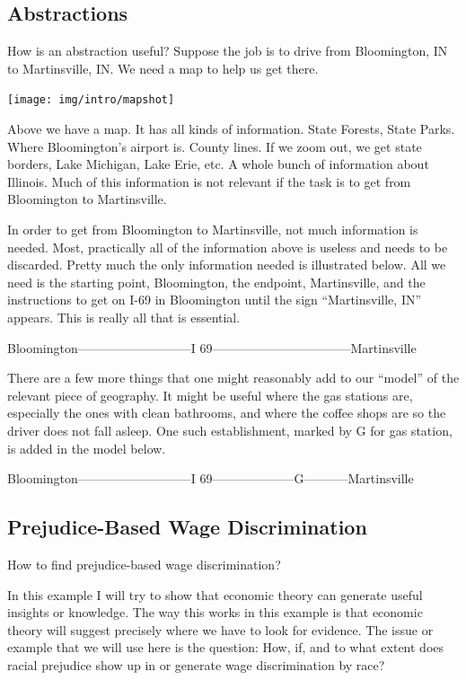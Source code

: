 \documentclass[
]{book}
\begin{document}
\hypertarget{abstractions}{%
\subsection{Abstractions}\label{abstractions}}

How is an abstraction useful? Suppose the job is to drive from Bloomington, IN to Martinsville, IN. We need a map to help us get there.

\texttt{[image: img/intro/mapshot]}

Above we have a map. It has all kinds of information. State Forests, State Parks. Where Bloomington's airport is. County lines. If we zoom out, we get state borders, Lake Michigan, Lake Erie, etc. A whole bunch of information about Illinois. Much of this information is not relevant if the task is to get from Bloomington to Martinsville.

In order to get from Bloomington to Martinsville, not much information is needed. Most, practically all of the information above is useless and needs to be discarded. Pretty much the only information needed is illustrated below. All we need is the starting point, Bloomington, the endpoint, Martinsville, and the instructions to get on I-69 in Bloomington until the sign ``Martinsville, IN'' appears. This is really all that is essential.

Bloomington---------------------------I 69---------------------------------Martinsville

There are a few more things that one might reasonably add to our ``model'' of the relevant piece of geography. It might be useful where the gas stations are, especially the ones with clean bathrooms, and where the coffee shops are so the driver does not fall asleep. One such establishment, marked by G for gas station, is added in the model below.

Bloomington---------------------------I 69--------------------G-----------Martinsville

\hypertarget{prejudice-based-wage-discrimination}{%
\subsection{Prejudice-Based Wage Discrimination}\label{prejudice-based-wage-discrimination}}

How to find prejudice-based wage discrimination?

In this example I will try to show that economic theory can generate useful insights or knowledge. The way this works in this example is that economic theory will suggest precisely where we have to look for evidence. The issue or example that we will use here is the question:
How, if, and to what extent does racial prejudice show up in or generate wage discrimination by race?
\end{document}
